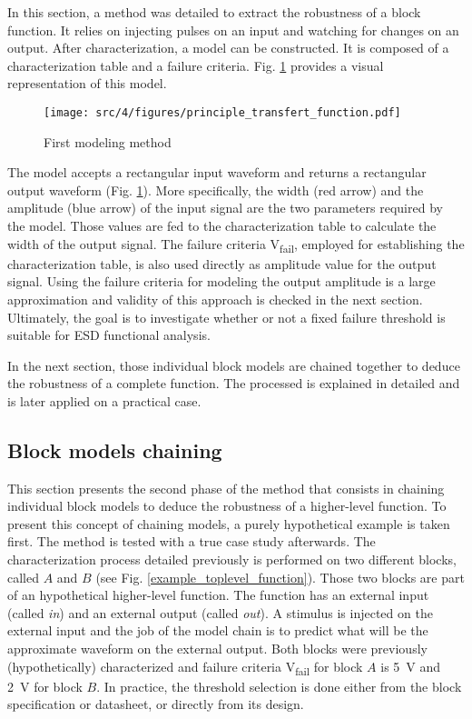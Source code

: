 In this section, a method was detailed to extract the robustness of a block function.
It relies on injecting pulses on an input and watching for changes on an output.
After characterization, a model can be constructed.
It is composed of a characterization table and a failure criteria.
Fig. \ref{fig:principle-transfert-func} provides a visual representation of this model.

\begin{figure}[!h]
  \centering
  \texttt{[image: src/4/figures/principle\_transfert\_function.pdf]}
  \caption{First modeling method}
  \label{fig:principle-transfert-func}
\end{figure}

The model accepts a rectangular input waveform and returns a rectangular output waveform (Fig. \ref{fig:principle-transfert-func}).
More specifically, the width (red arrow) and the amplitude (blue arrow) of the input signal are the two parameters required by the model.
Those values are fed to the characterization table to calculate the width of the output signal.
The failure criteria V\textsubscript{fail}, employed for establishing the characterization table, is also used directly as amplitude value for the output signal.
Using the failure criteria for modeling the output amplitude is a large approximation and validity of this approach is checked in the next section.
Ultimately, the goal is to investigate whether or not a fixed failure threshold is suitable for ESD functional analysis.

In the next section, those individual block models are chained together to deduce the robustness of a complete function.
The processed is explained in detailed and is later applied on a practical case.

\subsection{Block models chaining}
\label{sec:block-chaining}

This section presents the second phase of the method that consists in chaining individual block models to deduce the robustness of a higher-level function.
To present this concept of chaining models, a purely hypothetical example is taken first.
The method is tested with a true case study afterwards.
The characterization process detailed previously is performed on two different blocks, called $A$ and $B$ (see Fig. \ref{example_toplevel_function}).
Those two blocks are part of an hypothetical higher-level function.
The function has an external input (called \textit{in}) and an external output (called \textit{out}).
A stimulus is injected on the external input and the job of the model chain is to predict what will be the approximate waveform on the external output.
Both blocks were previously (hypothetically) characterized and failure criteria V\textsubscript{fail} for block $A$ is \SI{5}{\volt} and \SI{2}{\volt} for block $B$.
In practice, the threshold selection is done either from the block specification or datasheet, or directly from its design.


